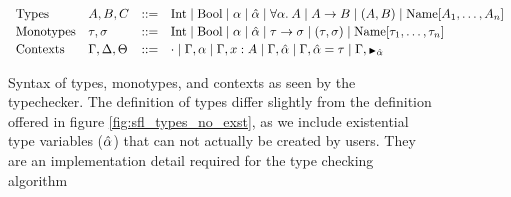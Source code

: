 \begin{figure}[h]
  \centering
  \begin{minipage}{\textwidth}
  \[
      \begin{array}{llcl}
      \text{Types} & A, B, C & \bnfas &
            \Inttype \bnfalt \Booltype \bnfalt \alpha \bnfalt \ahat \bnfalt 
            \alltype{\alpha}{A} \bnfalt A \arr B \bnfalt
            (A, B) \bnfalt
            \Unionname[A_1, \dots, A_n]
      \\[2pt]
      \text{Monotypes} & \tau,\sigma & \bnfas &
            \Inttype \bnfalt \Booltype \bnfalt \alpha \bnfalt \ahat \bnfalt 
            \tau \arr \sigma \bnfalt (\tau, \sigma) \bnfalt \Unionname[\tau_1, \dots, \tau_n]
        \\[2pt]
      \text{Contexts} & \Gamma, \Delta, \Theta & \bnfas &
                  \cdot
                  \bnfalt \Gamma, \alpha 
                  \bnfalt \Gamma, x:A
                  \bnfalt \Gamma, \ahat
                  \bnfalt \Gamma, \hypeq{\ahat}{\tau}
                  \bnfalt \Gamma, \MonnierComma{\ahat}
      \end{array}
  \]
  
  \captionsetup{justification=centering}\caption{Syntax of types, monotypes, and contexts as seen by the typechecker. The definition of types differ slightly from the definition offered in figure \ref{fig:sfl_types_no_exst}, as we include existential type variables ($\hat{\alpha}$) that can not actually be created by users. They are an implementation detail required for the type checking algorithm}


\end{minipage}
\end{figure}
